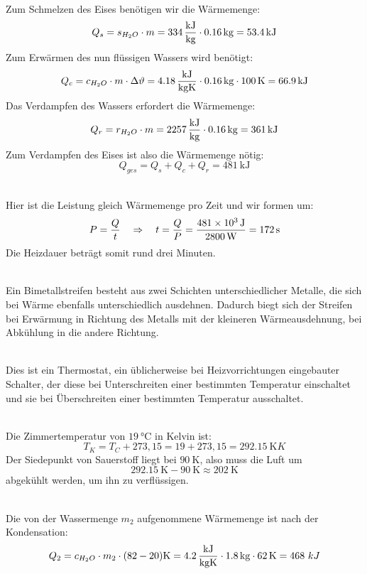 \documentclass[a4paper]{article}
\begin{document}
\\
Zum Schmelzen des Eises benötigen wir die Wärmemenge:
$$Q_s = s_{H_2O}\cdot m = \SI{334}{\kilo\joule\over \kilogram} \cdot \SI{0,16}{\kilogram} = \SI{53,4}{\kilo\joule}$$
Zum Erwärmen des nun flüssigen Wassers wird benötigt:
$$Q_c = c_{H_2O}\cdot m \cdot \Delta \vartheta = \SI{4,18}{\kilo\joule\over \kilogram\kelvin}\cdot \SI{0,16}{\kilogram} \cdot \SI{100}{\kelvin}= \SI{66,9}{\kilo\joule}$$
Das Verdampfen des Wassers erfordert die Wärmemenge:
$$Q_r = r_{H_2O}\cdot m = \SI{2257}{\kilo\joule\over \kilogram}\cdot \SI{0,16}{\kilogram} = \SI{361}{\kilo\joule}$$
Zum Verdampfen des Eises ist also die Wärmemenge nötig:
$$Q_{ges}=Q_s + Q_c + Q_r  = \SI{481}{\kilo\joule}$$
\vspace{0.5 cm}

\\
Hier ist die Leistung gleich Wärmemenge pro Zeit und wir formen um:
$$ P = {Q \over t} \quad \Rightarrow \quad t = {Q \over P} = {\SI{481e3}{\joule}\over \SI{2800}{\watt}}=\SI{172}{\second} $$
Die Heizdauer beträgt somit rund drei Minuten. 
\vspace{0.5 cm}

\\ 
Ein Bimetallstreifen besteht aus zwei Schichten unterschiedlicher Metalle, die sich bei Wärme ebenfalls unterschiedlich ausdehnen. Dadurch biegt sich der Streifen bei Erwärmung in Richtung des Metalls mit der kleineren Wärmeausdehnung, bei Abkühlung in die andere Richtung.
\vspace{0.5 cm}

\\
Dies ist ein Thermostat, ein üblicherweise bei Heizvorrichtungen eingebauter Schalter, der diese bei Unterschreiten einer bestimmten Temperatur einschaltet und sie bei Überschreiten einer bestimmten Temperatur ausschaltet.
\vspace{0.5 cm}

\\
Die Zimmertemperatur von $\SI{19}{\celsius}$ in Kelvin ist:
$$T_K = T_C + 273,15 = 19 + 273,15 = \SI{292,15}{\kelvin} K$$ 
Der Siedepunkt von Sauerstoff liegt bei $\SI{90}{\kelvin}$, also muss die Luft um
$$\SI{292,15}{\kelvin}- \SI{90}{\kelvin} \approx \SI{202}{\kelvin}$$ 
abgekühlt werden, um ihn zu verflüssigen.
\vspace{0.5 cm}

\\
Die von der Wassermenge $m_2$ aufgenommene Wärmemenge ist nach der Kondensation:
$$Q_2=c_{H_2O}\cdot m_2 \cdot (82-20)\SI{}{\kelvin} = \SI{4,2}{\kilo\joule\over \kilogram\kelvin}\cdot \SI{1,8}{\kilogram} \cdot \SI{62}{\kelvin} = 468~kJ$$
\vspace{0.5 cm}
\end{document}
